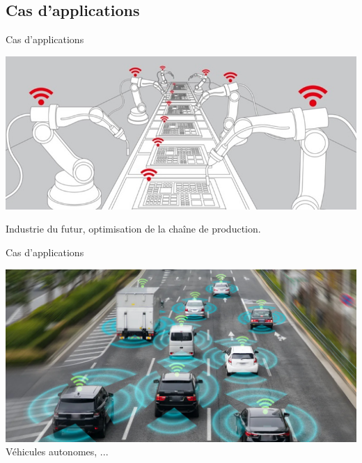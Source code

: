 \documentclass[10 pt]{beamer}
\begin{document}
\subsection{Cas d'applications }
\begin{frame}{Cas d'applications}


  \centering
  
  \includegraphics[scale=0.4]{ind40.jpg}

  Industrie du futur, optimisation de la chaîne de production.

\end{frame}
\begin{frame}{Cas d'applications}


  \centering
  
  \includegraphics[scale=0.25]{vehicle.jpg}
Véhicules autonomes, ...

\end{frame}
\end{document}
